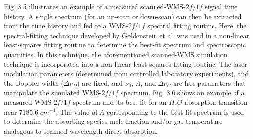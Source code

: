 Fig. 3.5 illustrates an example of a measured scanned-WMS-$2f/1f$ signal time history. A single spectrum (for an up-scan or down-scan) can then be extracted from the time history and fed to a WMS-$2f/1f$ spectral fitting routine. Here, the spectral-fitting technique developed by Goldenstein et al. \cite{Goldenstein2017} was used in a non-linear least-squares fitting routine to determine the best-fit spectrum and spectroscopic quantities. In this technique, the aforementioned scanned-WMS simulation technique is incorporated into a non-linear least-squares fitting routine. The laser modulation parameters (determined from controlled laboratory experiments), and the Doppler width ($\Delta\nu_D$) are fixed, and $\nu_0$, $A$, and $\Delta\nu_C$ are free-parameters that manipulate the simulated WMS-$2f/1f$ spectrum. Fig. 3.6 shows an example of a measured WMS-$2f/1f$ spectrum and its best fit for an $H_2O$ absorption transition near 7185.6 $cm^{-1}$. The value of $A$ corresponding to the best-fit spectrum is used to determine the absorbing species mole fraction and/or gas temperature analogous to scanned-wavelength direct absorption.



